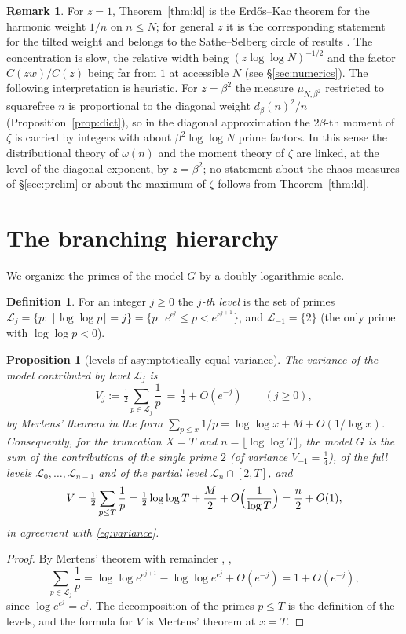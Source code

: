 \documentclass[11pt]{amsart}
\newtheorem{proposition}[theorem]{Proposition}
\theoremstyle{definition}
\newtheorem{definition}[theorem]{Definition}
\newtheorem{remark}[theorem]{Remark}
\newcommand{\half}{\tfrac12}
\newcommand{\loglog}{\log\log}
\begin{document}
\begin{remark}
For $z=1$, Theorem~\ref{thm:ld} is the Erd\H{o}s--Kac theorem \cite{ErdosKac} for the harmonic weight $1/n$ on
$n\le N$; for general $z$ it is the corresponding statement for the tilted weight and belongs to the
Sathe--Selberg circle of results \cite{Sathe,SelbergSathe}. The concentration is slow, the relative width being
$(z\loglog N)^{-1/2}$ and the factor $C(zw)/C(z)$ being far from $1$ at accessible $N$ (see
\S\ref{sec:numerics}). The following interpretation is heuristic. For $z=\beta^2$ the measure
$\mu_{N,\beta^2}$ restricted to squarefree $n$ is proportional to the diagonal weight $d_\beta(n)^2/n$
(Proposition~\ref{prop:dict}), so in the diagonal approximation the $2\beta$-th moment of $\zeta$ is carried by
integers with about $\beta^2\loglog N$ prime factors. In this sense the distributional theory of $\omega(n)$ and
the moment theory of $\zeta$ are linked, at the level of the diagonal exponent, by $z=\beta^2$; no statement
about the chaos measures of \S\ref{sec:prelim} or about the maximum of $\zeta$ follows from
Theorem~\ref{thm:ld}.
\end{remark}

\section{The branching hierarchy}\label{sec:branch}

We organize the primes of the model $G$ by a doubly logarithmic scale.

\begin{definition}
For an integer $j\ge0$ the \emph{$j$-th level} is the set of primes
$\mathcal L_j=\{p:\ \lfloor\loglog p\rfloor=j\}=\{p:\ e^{e^{j}}\le p<e^{e^{j+1}}\}$, and
$\mathcal L_{-1}=\{2\}$ (the only prime with $\loglog p<0$).
\end{definition}

\begin{proposition}[levels of asymptotically equal variance]\label{prop:levels}
The variance of the model contributed by level $\mathcal L_j$ is
\[
V_j:=\half\sum_{p\in\mathcal L_j}\frac1p\ =\ \half+O(e^{-j})\qquad(j\ge0),
\]
by Mertens' theorem in the form $\sum_{p\le x}1/p=\loglog x+M+O(1/\log x)$. Consequently, for the truncation
$X=T$ and $n=\lfloor\loglog T\rfloor$, the model $G$ is the sum of the contributions of the single prime $2$
(of variance $V_{-1}=\tfrac14$), of the full levels $\mathcal L_0,\dots,\mathcal L_{n-1}$ and of the partial
level $\mathcal L_n\cap[2,T]$, and
\[
V=\half\sum_{p\le T}\frac1p=\half\loglog T+\frac M2+O\Bigl(\frac1{\log T}\Bigr)=\frac n2+O(1),
\]
in agreement with \eqref{eq:variance}.
\end{proposition}
\begin{proof}
By Mertens' theorem with remainder \cite{Mertens}, \cite[Ch.~I.1]{Tenenbaum},
\[
\sum_{p\in\mathcal L_j}\frac1p=\loglog e^{e^{j+1}}-\loglog e^{e^{j}}+O(e^{-j})=1+O(e^{-j}),
\]
since $\log e^{e^{j}}=e^{j}$. The decomposition of the primes $p\le T$ is the definition of the levels, and the
formula for $V$ is Mertens' theorem at $x=T$.
\end{proof}
\end{document}
